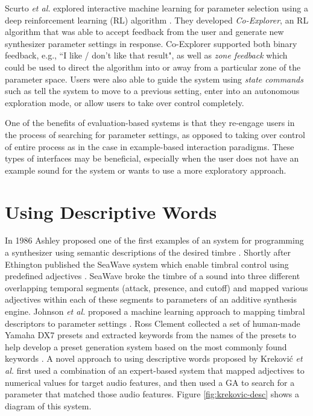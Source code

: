 Scurto \textit{et al.} \cite{scurto2021designing} explored interactive machine learning for parameter selection using a deep reinforcement learning (RL) algorithm \cite{sutton2018reinforcement}. They developed \textit{Co-Explorer}, an RL algorithm that was able to accept feedback from the user and generate new synthesizer parameter settings in response. Co-Explorer supported both binary feedback, e.g., ``I like / don't like that result", as well as \textit{zone feedback} which could be used to direct the algorithm into or away from a particular zone of the parameter space. Users were also able to guide the system using \textit{state commands} such as tell the system to move to a previous setting, enter into an autonomous exploration mode, or allow users to take over control completely.

One of the benefits of evaluation-based systems is that they re-engage users in the process of searching for parameter settings, as opposed to taking over control of entire process as in the case in example-based interaction paradigms. These types of interfaces may be beneficial, especially when the user does not have an example sound for the system or wants to use a more exploratory approach.

\section{Using Descriptive Words}\label{section:descriptive-words}
In 1986 Ashley proposed one of the first examples of an system for programming a synthesizer using semantic descriptions of the desired timbre \cite{ashley1986knowledge}. Shortly after Ethington published the SeaWave system which enable timbral control using predefined adjectives \cite{ethington1994seawave}. SeaWave broke the timbre of a sound into three different overlapping temporal segments (attack, presence, and cutoff) and mapped various adjectives within each of these segments to parameters of an additive synthesis engine. Johnson \textit{et al.} proposed a machine learning approach to mapping timbral descriptors to parameter settings \cite{johnson2006timbre}. Ross Clement collected a set of human-made Yamaha DX7 presets and extracted keywords from the names of the presets to help develop a preset generation system based on the most commonly found keywords \cite{clement2011automatic}. A novel approach to using descriptive words proposed by Krekovi\'{c} \textit{et al.} \cite{krekovic2016algorithm} first used a combination of an expert-based system that mapped adjectives to numerical values for target audio features, and then used a GA to search for a parameter that matched those audio features. Figure \ref{fig:krekovic-desc} shows a diagram of this system.

